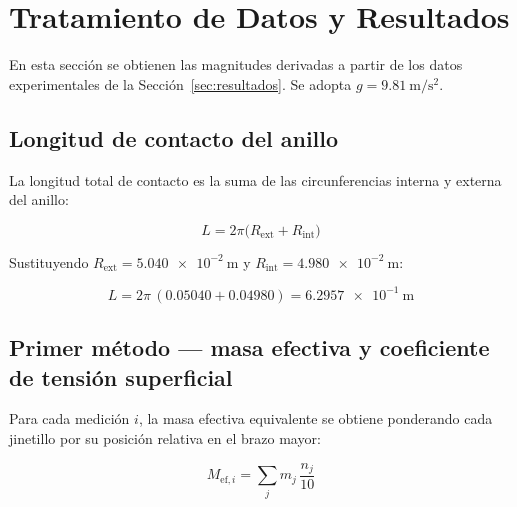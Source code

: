 
\section{Tratamiento de Datos y Resultados}
\label{sec:tratamiento}

En esta sección se obtienen las magnitudes derivadas a partir de los
datos experimentales de la Sección~\ref{sec:resultados}. Se adopta
$g = \qty{9.81}{\meter\per\second\squared}$.

\subsection{Longitud de contacto del anillo}

La longitud total de contacto es la suma de las circunferencias interna
y externa del anillo:

\begin{equation}
    L = 2\pi\bigl(R_{\text{ext}} + R_{\text{int}}\bigr)
    \label{eq:t9_longitud_contacto}
\end{equation}

Sustituyendo $R_{\text{ext}} = \qty{5.040e-2}{\meter}$ y
$R_{\text{int}} = \qty{4.980e-2}{\meter}$:

\begin{equation*}
    L = 2\pi\,(\num{0.05040} + \num{0.04980}) = \qty{6.2957e-1}{\meter}
\end{equation*}

\subsection{Primer método — masa efectiva y coeficiente de tensión
superficial}

Para cada medición $i$, la masa efectiva equivalente se obtiene
ponderando cada jinetillo por su posición relativa en el brazo mayor:

\begin{equation}
    M_{\text{ef},i} = \sum_{j} m_j \,\frac{n_j}{10}
    \label{eq:t9_masa_efectiva}
\end{equation}

